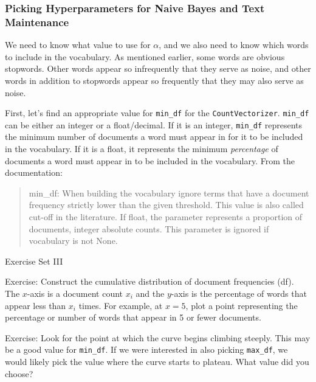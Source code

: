 \documentclass[11pt]{article}
\begin{document}
    \subsubsection{Picking Hyperparameters for Naive Bayes and Text
Maintenance}\label{picking-hyperparameters-for-naive-bayes-and-text-maintenance}

    We need to know what value to use for \(\alpha\), and we also need to
know which words to include in the vocabulary. As mentioned earlier,
some words are obvious stopwords. Other words appear so infrequently
that they serve as noise, and other words in addition to stopwords
appear so frequently that they may also serve as noise.

    First, let's find an appropriate value for \texttt{min\_df} for the
\texttt{CountVectorizer}. \texttt{min\_df} can be either an integer or a
float/decimal. If it is an integer, \texttt{min\_df} represents the
minimum number of documents a word must appear in for it to be included
in the vocabulary. If it is a float, it represents the minimum
\emph{percentage} of documents a word must appear in to be included in
the vocabulary. From the documentation:

    \begin{quote}
min\_df: When building the vocabulary ignore terms that have a document
frequency strictly lower than the given threshold. This value is also
called cut-off in the literature. If float, the parameter represents a
proportion of documents, integer absolute counts. This parameter is
ignored if vocabulary is not None.
\end{quote}

    Exercise Set III

Exercise: Construct the cumulative distribution of document frequencies
(df). The \(x\)-axis is a document count \(x_i\) and the \(y\)-axis is
the percentage of words that appear less than \(x_i\) times. For
example, at \(x=5\), plot a point representing the percentage or number
of words that appear in 5 or fewer documents.

Exercise: Look for the point at which the curve begins climbing steeply.
This may be a good value for \texttt{min\_df}. If we were interested in
also picking \texttt{max\_df}, we would likely pick the value where the
curve starts to plateau. What value did you choose?
\end{document}
